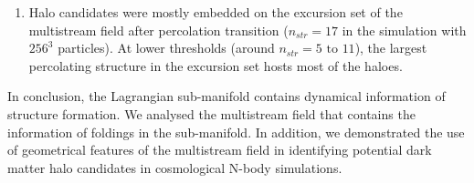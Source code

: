 \begin{enumerate}
\item Halo candidates were mostly embedded on the excursion set of the multistream field after percolation transition ($n_{str} = 17$ in the simulation with $256^3$ particles). At lower thresholds (around $n_{str} = 5 \text{ to } 11$), the largest percolating structure in the excursion set hosts most of the haloes.     

\end{enumerate}

In conclusion, the Lagrangian sub-manifold contains dynamical information of structure formation. We analysed the multistream field that contains the information of foldings in the sub-manifold. In addition, we demonstrated the use of geometrical features of the multistream field in identifying potential dark matter halo candidates in cosmological N-body simulations. 


% 


